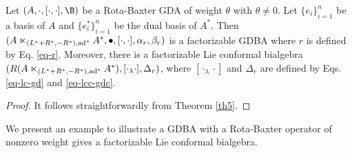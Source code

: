\documentclass[12pt]{amsart}
\begin{document}
                \begin{corollary}\label{cor-rbgda-f}
                Let  $(A,\cdot,[\cdot,\cdot],\B)$ be a Rota-Baxter GDA of weight  $\theta$ with $\theta\neq 0$. Let $\{e_i\}_{i=1}^n$ be a  basis of  $A$ and $\{e_i^*\}_{i=1}^n$ be the dual basis
                of $A^{*}$. Then $(A\ltimes_{(L^*+R^*,-R^*),{\rm ad}^*}A^*, \bullet,[\cdot,\cdot],\alpha_r,\beta_r)$ is a factorizable GDBA where $r$ is defined by Eq.
                \eqref{eq-r}. Moreover, there is a factorizable Lie conformal bialgebra $( R(A\ltimes_{(L^*+R^*,-R^*),{\rm ad}^*}A^*),[\cdot_\lambda\cdot],\Delta_r )$, where $[\cdot_\lambda\cdot]$
                and $\Delta_r$ are defined by Eqs. \eqref{eq-lc-gd} and
                \eqref{eq-lcc-gdc}.%
            \end{corollary}
            \begin{proof}
                It follows straightforwardly from Theorem \ref{th5}.
 \end{proof}




         We present an example to illustrate a GDBA with a
Rota-Baxter operator of nonzero weight gives a factorizable Lie
conformal bialgebra.
\end{document}
